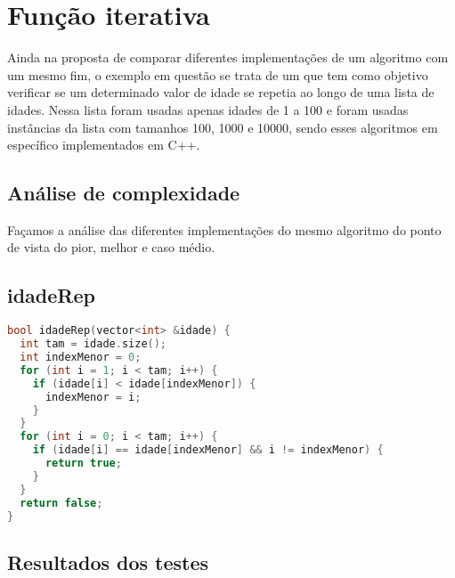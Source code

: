 \section{Função iterativa}
\label{sec:func-it}

Ainda na proposta de comparar diferentes implementações de um algoritmo com um mesmo fim, o exemplo em questão se trata de um que tem como objetivo verificar se um determinado valor de idade se repetia ao longo de uma lista de idades. Nessa lista foram usadas apenas idades de 1 a 100 e foram usadas instâncias da lista com tamanhos 100, 1000 e 10000, sendo esses algoritmos em específico implementados em C++.

\subsection{Análise de complexidade}

Façamos a análise das diferentes implementações do mesmo algoritmo do ponto de vista do pior, melhor e caso médio.

\subsection{idadeRep}

\begin{lstlisting}[language=C++]
bool idadeRep(vector<int> &idade) {
  int tam = idade.size();
  int indexMenor = 0;
  for (int i = 1; i < tam; i++) {
    if (idade[i] < idade[indexMenor]) {
      indexMenor = i;
    }
  }
  for (int i = 0; i < tam; i++) {
    if (idade[i] == idade[indexMenor] && i != indexMenor) {
      return true;
    }
  }
  return false;
}
\end{lstlisting}


\subsection{Resultados dos testes}
